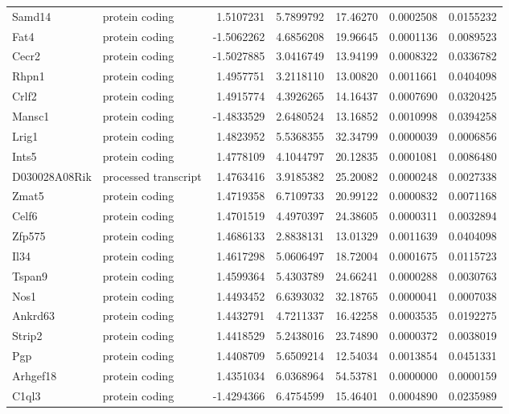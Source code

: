 \documentclass[onehalf,12pt]{beavtex}
\begin{document}
\begin{longtable}{llrrrrr}
  Samd14 & protein coding & 1.5107231 & 5.7899792 & 17.46270 & 0.0002508 & 0.0155232\\
  \addlinespace
  Fat4 & protein coding & -1.5062262 & 4.6856208 & 19.96645 & 0.0001136 & 0.0089523\\
  Cecr2 & protein coding & -1.5027885 & 3.0416749 & 13.94199 & 0.0008322 & 0.0336782\\
  Rhpn1 & protein coding & 1.4957751 & 3.2118110 & 13.00820 & 0.0011661 & 0.0404098\\
  Crlf2 & protein coding & 1.4915774 & 4.3926265 & 14.16437 & 0.0007690 & 0.0320425\\
  Mansc1 & protein coding & -1.4833529 & 2.6480524 & 13.16852 & 0.0010998 & 0.0394258\\
  \addlinespace
  Lrig1 & protein coding & 1.4823952 & 5.5368355 & 32.34799 & 0.0000039 & 0.0006856\\
  Ints5 & protein coding & 1.4778109 & 4.1044797 & 20.12835 & 0.0001081 & 0.0086480\\
  D030028A08Rik & processed transcript & 1.4763416 & 3.9185382 & 25.20082 & 0.0000248 & 0.0027338\\
  Zmat5 & protein coding & 1.4719358 & 6.7109733 & 20.99122 & 0.0000832 & 0.0071168\\
  Celf6 & protein coding & 1.4701519 & 4.4970397 & 24.38605 & 0.0000311 & 0.0032894\\
  \addlinespace
  Zfp575 & protein coding & 1.4686133 & 2.8838131 & 13.01329 & 0.0011639 & 0.0404098\\
  Il34 & protein coding & 1.4617298 & 5.0606497 & 18.72004 & 0.0001675 & 0.0115723\\
  Tspan9 & protein coding & 1.4599364 & 5.4303789 & 24.66241 & 0.0000288 & 0.0030763\\
  Nos1 & protein coding & 1.4493452 & 6.6393032 & 32.18765 & 0.0000041 & 0.0007038\\
  Ankrd63 & protein coding & 1.4432791 & 4.7211337 & 16.42258 & 0.0003535 & 0.0192275\\
  \addlinespace
  Strip2 & protein coding & 1.4418529 & 5.2438016 & 23.74890 & 0.0000372 & 0.0038019\\
  Pgp & protein coding & 1.4408709 & 5.6509214 & 12.54034 & 0.0013854 & 0.0451331\\
  Arhgef18 & protein coding & 1.4351034 & 6.0368964 & 54.53781 & 0.0000000 & 0.0000159\\
  C1ql3 & protein coding & -1.4294366 & 6.4754599 & 15.46401 & 0.0004890 & 0.0235989\\

\end{longtable}
\end{document}
